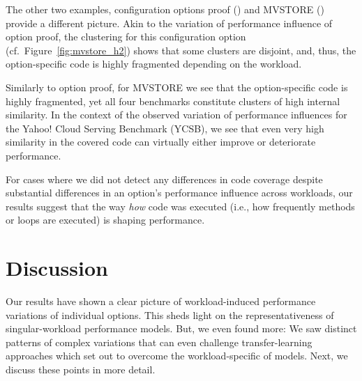 {{The other two examples, configuration options \textsf{proof} (\zdrei) and \textsf{MVSTORE} (\htwo) provide a different picture. Akin to the variation of performance influence of option \textsf{proof}, the clustering for this configuration option (cf.~Figure~\ref{fig:mvstore_h2}) shows that some clusters are disjoint, and, thus, the option-specific code is highly fragmented depending on the workload. 

Similarly to option \textsf{proof}, for \textsf{MVSTORE} we see that the option-specific code is highly fragmented, yet all four benchmarks constitute clusters of high internal similarity. In the context of the observed variation of performance influences for the Yahoo! Cloud Serving Benchmark (YCSB), we see that even very high similarity in the covered code can virtually either improve or deteriorate performance.

For cases where we did not detect any differences in code coverage despite substantial differences in an option's performance influence across workloads, our results suggest that the way \emph{how} code was executed (i.e., how frequently methods or loops are executed) is shaping performance.

\vspace{1mm}

\section{Discussion}
Our results have shown a clear picture of workload-induced performance variations of individual options. This sheds light on the representativeness of singular-workload performance models. But, we even found more: We saw distinct patterns of complex variations that can even challenge transfer-learning approaches which set out to overcome the workload-specific of models. Next, we discuss these points in more detail.

}}
